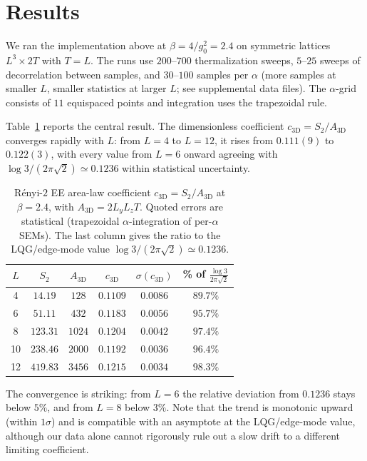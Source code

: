 \documentclass[aps,prl,reprint,superscriptaddress,floatfix,nofootinbib,amssymb]{revtex4-2}
\begin{document}
\section{Results}
\label{sec:results}

We ran the implementation above at $\beta\!=\!4/g_0^2\!=\!2.4$ on symmetric lattices $L^3\!\times\!2T$ with $T=L$. The runs use $200\text{--}700$ thermalization sweeps, $5\text{--}25$ sweeps of decorrelation between samples, and $30\text{--}100$ samples per $\alpha$ (more samples at smaller $L$, smaller statistics at larger $L$; see supplemental data files). The $\alpha$-grid consists of $11$ equispaced points and integration uses the trapezoidal rule.

Table~\ref{tab:c3D} reports the central result. The dimensionless coefficient $c_{3\text{D}}\!=\!S_2/A_{3\text{D}}$ converges rapidly with $L$: from $L\!=\!4$ to $L\!=\!12$, it rises from $0.111(9)$ to $0.122(3)$, with every value from $L\!=\!6$ onward agreeing with $\log 3 / (2\pi\sqrt 2) \simeq 0.1236$ within statistical uncertainty.

\begin{table}[tb]
\centering
\caption{R\'enyi-$2$ EE area-law coefficient $c_{3\text{D}}=S_2/A_{3\text{D}}$ at $\beta=2.4$, with $A_{3\text{D}}=2L_y L_z T$. Quoted errors are statistical (trapezoidal $\alpha$-integration of per-$\alpha$ SEMs). The last column gives the ratio to the LQG/edge-mode value $\log 3/(2\pi\sqrt 2)\!\simeq\!0.1236$.}
\label{tab:c3D}
\begin{ruledtabular}
\begin{tabular}{cccccc}
$L$ & $S_2$ & $A_{3\text{D}}$ & $c_{3\text{D}}$ & $\sigma(c_{3\text{D}})$ & \% of $\frac{\log 3}{2\pi\sqrt 2}$ \\
\hline
4  & $14.19$   & $128$  & $0.1109$ & $0.0086$ & $89.7\%$ \\
6  & $51.11$   & $432$  & $0.1183$ & $0.0056$ & $95.7\%$ \\
8  & $123.31$  & $1024$ & $0.1204$ & $0.0042$ & $97.4\%$ \\
10 & $238.46$  & $2000$ & $0.1192$ & $0.0036$ & $96.4\%$ \\
12 & $419.83$  & $3456$ & $0.1215$ & $0.0034$ & $98.3\%$ \\
\end{tabular}
\end{ruledtabular}
\end{table}

The convergence is striking: from $L\!=\!6$ the relative deviation from $0.1236$ stays below $5\%$, and from $L\!=\!8$ below $3\%$. Note that the trend is monotonic upward (within $1\sigma$) and is compatible with an asymptote at the LQG/edge-mode value, although our data alone cannot rigorously rule out a slow drift to a different limiting coefficient.
\end{document}
